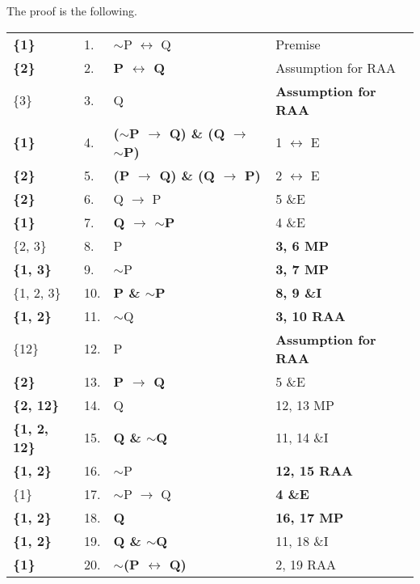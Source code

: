 \documentclass[a4paper,12pt]{article}
\newcommand{\ra}{$\rightarrow$ }
\newcommand{\lra}{$\leftrightarrow$ }
\newcommand{\s}{$\sim$}
\begin{document}
\begin{enumerate}[label=\arabic*,leftmargin=*]
\begin{enumerate}[label=\arabic*.]
        \end{enumerate}

        \begin{minipage}{\textwidth}
        \item The proof is the following.
            \vspace{1em}\\
            \begin{tabular}{l l l l}
                \textbf{\{1\}} & 1. & \s P \lra Q & Premise\\
                \textbf{\{2\}} & 2. & \textbf{P \lra Q} & Assumption for RAA\\
                \{3\} & 3. & Q & \textbf{Assumption for RAA}\\
                \textbf{\{1\}} & 4. & \textbf{(\s P \ra Q) \& (Q \ra \s P)} & 1 \lra E\\
                \textbf{\{2\}} & 5. & \textbf{(P \ra Q) \& (Q \ra P)} & 2 \lra E\\
                \textbf{\{2\}} & 6. & Q \ra P & 5 \&E\\
                \textbf{\{1\}} & 7. & \textbf{Q \ra \s P} & 4 \&E\\
                \{2, 3\} & 8. & P & \textbf{3, 6 MP} \\
                \textbf{\{1, 3\}} & 9. & \s P & \textbf{3, 7 MP} \\
                \{1, 2, 3\} & 10. & \textbf{P \& \s P} & \textbf{8, 9 \&I} \\
                \textbf{\{1, 2\}} & 11. & \s Q & \textbf{3, 10 RAA}\\
                \{12\} & 12. & P & \textbf{Assumption for RAA} \\
                \textbf{\{2\}} & 13. & \textbf{P \ra Q} & 5 \&E\\
                \textbf{\{2, 12\}} & 14. & Q & 12, 13 MP\\
                \textbf{\{1, 2, 12\}} & 15. & \textbf{Q \& \s Q} & 11, 14 \&I\\
                \textbf{\{1, 2\}} & 16. & \s P & \textbf{12, 15 RAA}\\
                \{1\} & 17. & \s P \ra Q & \textbf{4 \&E}\\
                \textbf{\{1, 2\}} & 18. & \textbf{Q} & \textbf{16, 17 MP} \\
                \textbf{\{1, 2\}} & 19. & \textbf{Q \& \s Q} & 11, 18 \&I\\
                \textbf{\{1\}} & 20. & \textbf{\s (P \lra Q)} & 2, 19 RAA\\
            \end{tabular}
        \end{minipage}


\end{enumerate}
\end{document}
